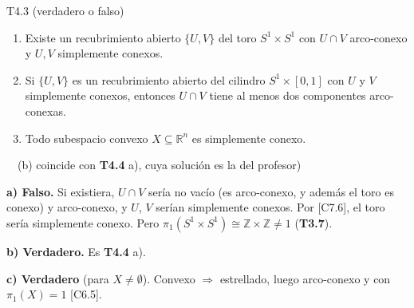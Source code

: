 \begin{ejercicio}{T4.3 (verdadero o falso)}
\begin{enumerate}
    \item[a)] Existe un recubrimiento abierto $\{U,V\}$ del toro $S^1 \times S^1$ con $U \cap V$ arco-conexo y $U, V$ simplemente conexos.
    \item[b)] Si $\{U,V\}$ es un recubrimiento abierto del cilindro $S^1 \times [0,1]$ con $U$ y $V$ simplemente conexos, entonces $U \cap V$ tiene al menos dos componentes arco-conexas.
    \item[c)] Todo subespacio convexo $X \subseteq \mathbb{R}^n$ es simplemente conexo.
\end{enumerate}

\sol \fuentepropia\ \ (b) coincide con \textbf{T4.4} a), cuya solución es la del profesor)

\textbf{a) Falso.} Si existiera, $U \cap V$ sería no vacío (es arco-conexo, y además el toro es conexo) y arco-conexo, y $U$, $V$ serían simplemente conexos. Por [C7.6], el toro sería simplemente conexo. Pero $\pi_1(S^1 \times S^1) \cong \mathbb{Z} \times \mathbb{Z} \neq 1$ (\textbf{T3.7}).

\textbf{b) Verdadero.} Es \textbf{T4.4} a).

\textbf{c) Verdadero} (para $X \neq \emptyset$). Convexo $\Rightarrow$ estrellado, luego arco-conexo y con $\pi_1(X) = 1$ [C6.5].
\end{ejercicio}

